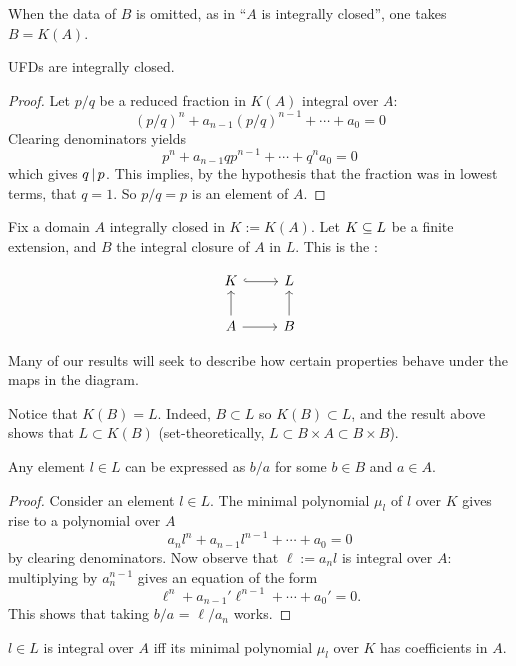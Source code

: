 When the data of $B$ is omitted, as in ``$A$ is integrally closed'', one takes $B = K(A)$.

\begin{prop}
  UFDs are integrally closed.
\end{prop}
\begin{proof}
  Let $p/q$ be a reduced fraction in $K(A)$ integral over $A$:
  \[ (p/q)^n + a_{n-1}(p/q)^{n-1} + \cdots + a_0 = 0 \]
  Clearing denominators yields
  \[ p^n     + a_{n-1} q p^{n-1}  + \cdots + q^n a_0 = 0 \]
  which gives $\divides q p$. This implies, by the hypothesis that the fraction was in lowest terms,
  that $q = 1$. So $p/q = p$ is an element of $A$.
\end{proof}

\medskip\noindent
Fix a domain $A$ integrally closed in $K := K(A)$. Let $\ringExtension L K$ be a
finite extension, and $B$ the integral closure of $A$ in $L$. This is the
:

\[
  \begin{tikzcd}
    K \arrow[r, hook] & L \\
    A \arrow[u] 
      \arrow[r]       & B \arrow[u]
  \end{tikzcd}
\]

Many of our results will seek to describe how certain properties behave under
the maps in the diagram.

\begin{remark}
  Notice that $K(B) = L$. Indeed, $B \subset L$ so $K(B) \subset L$, and the
  result above shows that $L \subset K(B)$ (set-theoretically, $L \subset B
  \times A \subset B \times B$).
\end{remark}

\begin{theorem}
  Any element $l \in L$ can be expressed as $b/a$ for some $b \in B$ and $a \in A$.
\end{theorem}

\begin{proof}
  Consider an element $l \in L$. The minimal polynomial $\mu_l$ of $l$ over $K$
  gives rise to a polynomial over $A$
  \[ a_nl^n + a_{n-1}l^{n-1} + \cdots + a_0 = 0 \] by clearing denominators. Now
  observe that $\ell := a_nl$ is integral over $A$: multiplying by $a_n^{n-1}$
  gives an equation of the form
  \[ \ell^n + a_{n-1}'\ell^{n-1} + \cdots + a_0' = 0. \] This shows that taking
  $b/a$ = $\ell/a_n$ works.
\end{proof}

\begin{theorem}
  $l \in L$ is integral over $A$ iff its minimal polynomial $\mu_l$ over $K$ has
  coefficients in $A$.
\end{theorem} 


